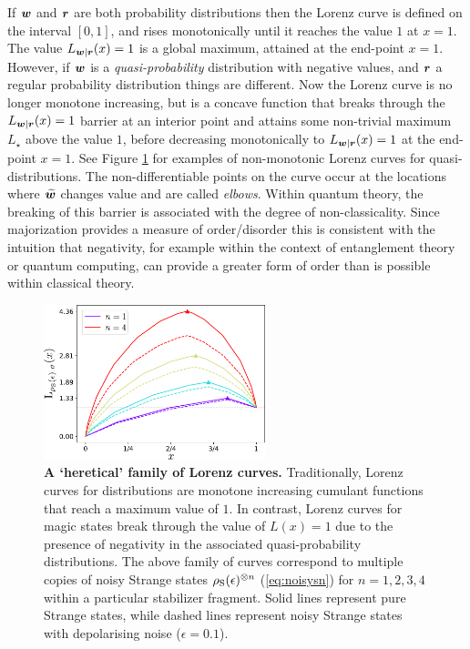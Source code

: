 \documentclass[pra,
aps,
twocolumn,
superscriptaddress,
groupedaddress,
nofootinbib,
reprint
]{revtex4-1}
\begin{document}
If $\boldsymbol{w}$ and $\boldsymbol{r}$ are both probability distributions then the Lorenz curve is defined on the interval $[0,1]$, and rises monotonically until it reaches the value $1$ at $x=1$. The value $L_{\boldsymbol{w}|\boldsymbol{r}}(x) = 1$ is a global maximum, attained at the end-point $x=1$. However, if $\boldsymbol{w}$ is a \emph{quasi-probability} distribution with negative values, and $\boldsymbol{r}$ a regular probability distribution things are different. Now the Lorenz curve is no longer monotone increasing, but is a concave function that breaks through the $L_{\boldsymbol{w}|\boldsymbol{r}}(x) = 1$ barrier at an interior point and attains some non-trivial maximum $L_\star$ above the value $1$, before decreasing monotonically to $L_{\boldsymbol{w}|\boldsymbol{r}}(x)= 1$ at the end-point $x=1$. See Figure \ref{fig:lcs} for examples of non-monotonic Lorenz curves for quasi-distributions. The non-differentiable points on the curve occur at the locations where $\widetilde{\bm{w}}$ changes value and are called \emph{elbows}. Within quantum theory, the breaking of this barrier is associated with the degree of non-classicality. Since majorization provides a measure of order/disorder this is consistent with the intuition that negativity, for example within the context of entanglement theory or quantum computing, can provide a greater form of order than is possible within classical theory.

\begin{figure}
    \centering
    \includegraphics[height=4.5cm]{figs/lc_strange.pdf}
    \caption{\textbf{A `heretical' family of Lorenz curves.} Traditionally, Lorenz curves for distributions are monotone increasing cumulant functions that reach a maximum value of $1$. In contrast, Lorenz curves for magic states break through the value of $L(x)=1$ due to the presence of negativity in the associated quasi-probability distributions. The above family of curves correspond to multiple copies of noisy Strange states $\rho_{\rm{S}}(\epsilon)^{\otimes n}$ (\cref{eq:noisysn}) for $n=1,2,3,4$ within a particular stabilizer fragment. Solid lines represent pure Strange states, while dashed lines represent noisy Strange states with depolarising noise ($\epsilon = 0.1$).
    }
    \label{fig:lcs}
\end{figure}
\end{document}
